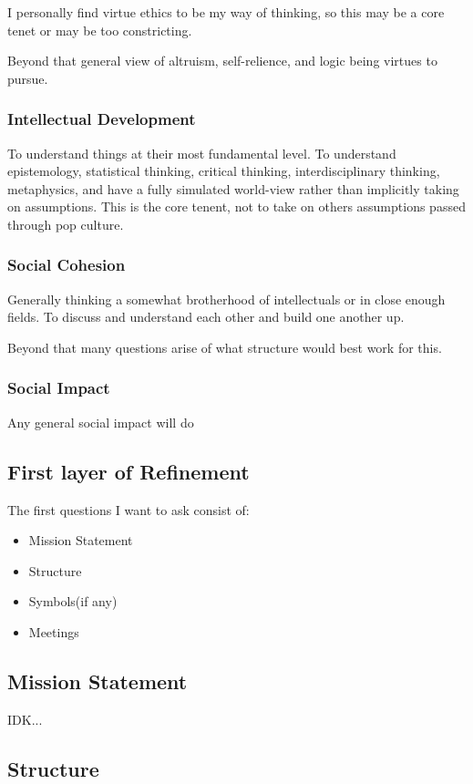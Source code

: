 I personally find virtue ethics to be my way of thinking, so this may be a core tenet or may be too constricting.

Beyond that general view of altruism, self-relience, and logic being virtues to pursue.
\subsubsection{Intellectual Development}
To understand things at their most fundamental level. To understand epistemology, statistical thinking, critical thinking, interdisciplinary thinking, metaphysics, and have a fully simulated world-view rather than implicitly taking on assumptions. This is the core tenent, not to take on others assumptions passed through pop culture.

\subsubsection{Social Cohesion}
Generally thinking a somewhat brotherhood of intellectuals or in close enough fields. To discuss and understand each other and build one another up.

Beyond that many questions arise of what structure would best work for this.

\subsubsection{Social Impact}

Any general social impact will do

\subsection{First layer of Refinement}
The first questions I want to ask consist of:
\begin{itemize}
  \item Mission Statement
  \item Structure
  \item Symbols(if any)
  \item Meetings
\end{itemize}
\subsection{Mission Statement}

IDK...

\subsection{Structure}

